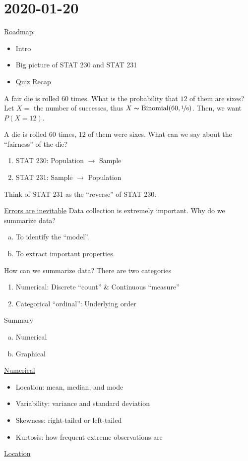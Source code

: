 \section{2020-01-20}
\underline{Roadmap}:
\begin{itemize}
    \item Intro
    \item Big picture of STAT 230 and STAT 231
    \item Quiz Recap
\end{itemize}
\begin{exbox}
    \begin{example}[STAT 230]
        A fair die is rolled $ 60 $ times. What is the
        probability that $ 12 $ of them are sixes?
        Let $ X= $ the number of successes, thus $ X \thicksim \operatorname{Binomial}(60,\nicefrac{1}{6}) $.
        Then, we want $ P(X=12) $.
    \end{example}
\end{exbox}
\begin{exbox}
    \begin{example}[STAT 231]
        A die is rolled $ 60 $ times, $ 12 $ of them were sixes.
        What can we say about the ``fairness'' of the die?
    \end{example}
\end{exbox}
\begin{enumerate}
    \item STAT 230: Population $ \rightarrow $ Sample
    \item STAT 231: Sample $ \rightarrow $ Population
\end{enumerate}
Think of STAT 231 as the ``reverse'' of STAT 230.

\underline{Errors are inevitable} Data collection
is extremely important. Why do we summarize data?
\begin{enumerate}[(a)]
    \item To identify the ``model''.
    \item To extract important properties.
\end{enumerate}
How can we summarize data? There are two categories
\begin{enumerate}[(1)]
    \item Numerical: Discrete ``count'' \& Continuous ``measure''
    \item Categorical ``ordinal'': Underlying order
\end{enumerate}
Summary
\begin{enumerate}[(a)]
    \item Numerical
    \item Graphical
\end{enumerate}
\underline{Numerical}
\begin{itemize}
    \item Location: mean, median, and mode
    \item Variability: variance and standard deviation
    \item Skewness: right-tailed or left-tailed
    \item Kurtosis: how frequent extreme observations are
\end{itemize}
\underline{Location}

